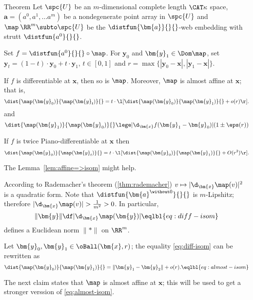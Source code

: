 \begin{thm}{Theorem}\label{thm:loc-lip-inverse+}
Let $\spc{U}$ be an $m$-dimensional complete length $\CAT\kappa$ space, 
$\bm{a}=(a^0,a^1,\dots a^m)$ be a nondegenerate point array in $\spc{U}$
and $\map\:\RR^m\subto\spc{U}$ be the $\distfun{\bm{a}}{}{}$-web embedding 
with strutt $\distfun{a^0}{}{}$.

Set $f=\distfun{a^0}{}{}\circ\map$.
For $\bm{y}_0$ and $\bm{y}_1\in\Dom\map$,
set $\bm{y}_t=(1-t)\cdot \bm{y}_0+t\cdot \bm{y}_1 $, $t\in [0,1]$
and $r=\max\{|\bm{y}_0-\bm{x}|,|\bm{y}_1-\bm{x}|\}$.

\begin{subthm}{}
If $f$ is differentiable at $\bm{x}$, then so is $\map$.
Moreover, $\map$ is almost affine at $\bm{x}$;
that is,
\[\dist{\map(\bm{y}_0)}{\map(\bm{y}_t)}{}
=
t
\cdot
\l[
\dist{\map(\bm{y}_0)}{\map(\bm{y}_1)}{}
+
o(r)
\r].
\]
and 
\[
\dist{\map(\bm{y}_1)}{\map(\bm{y}_0)}{}
\lege
|\d_{\bm{x}}f(\bm{y}_1-\bm{y}_0)|(1\pm\eps(r))%
\]

\end{subthm}

\begin{subthm}{}
If $f$ is twice Piano-differentiable at $\bm{x}$ 
then 
\[\dist{\map(\bm{y}_0)}{\map(\bm{y}_t)}{}
=
t
\cdot
\l[
\dist{\map(\bm{y}_0)}{\map(\bm{y}_1)}{}
+
O(r^2)
\r].
\]
\end{subthm}

\end{thm}

The Lemma~\ref{lem:affine=>isom} might help.











According to Rademacher's theorem (\ref{thm:rademacher}) 
$v\mapsto |\d_{\bm{x}}\map(v)|^2$
is a quadratic form.
Note that $\distfun{\bm{a}^{\without 0}}{}{}$ is $m$-Lipshitz;
therefore $|\d_{\bm{x}}\map(v)|>\tfrac1{m^2}>0$.
In particular, 
\[
\|\bm{y}\|
\df
|\d_{\bm{x}}\map(\bm{y})|
\eqlbl{eq:diff-isom}
\]
defines a Euclidean norm $\|{*}\|$ on $\RR^m$.

Let $\bm{y}_0,\bm{y}_1\in\oBall(\bm{x},r)$;
the equality \ref{eq:diff-isom} can be rewritten as
\[\dist{\map(\bm{y}_0)}{\map(\bm{y}_1)}{}=\|\bm{y}_1-\bm{y}_2\|+o(r).
\eqlbl{eq:almost-isom}\]

The next claim states that $\map$ is almost affine at $\bm{x}$;
this will be used to get a stronger verssion of \ref{eq:almost-isom}.

